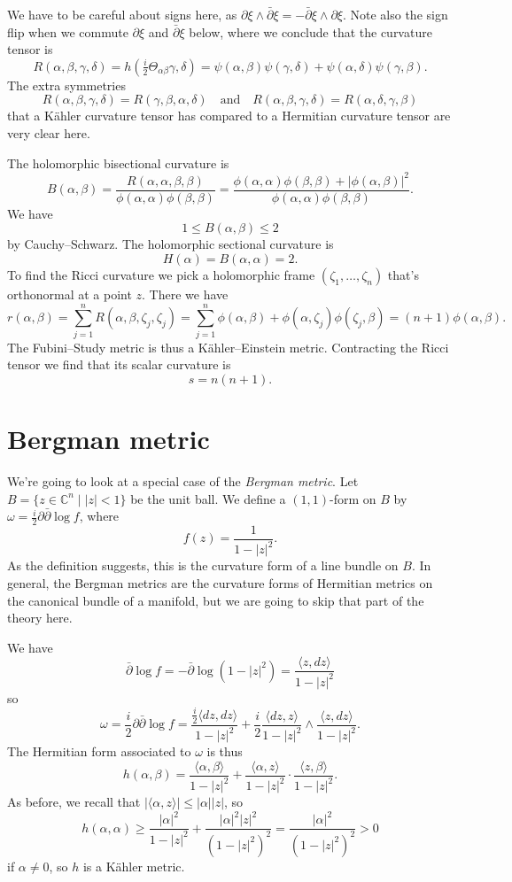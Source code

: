 \documentclass[10pt,a4paper]{article}
\newcommand{\kk}[1]{\mathbb{#1}}
\begin{document}
We have to be careful about signs here, as $\partial \xi \wedge \bar\partial \xi = - \bar\partial \xi \wedge \partial \xi$. Note also the sign flip when we commute $\partial\xi$ and $\bar\partial\xi$ below, where we conclude that the curvature tensor is
$$
R(\alpha,\beta,\gamma,\delta)
= h(\tfrac i2\Theta_{\alpha \beta} \gamma, \delta)
= \psi(\alpha, \beta) \psi(\gamma, \delta)
+ \psi(\alpha, \delta) \psi(\gamma, \beta).
$$
The extra symmetries
$$
R(\alpha,\beta,\gamma,\delta) = R(\gamma,\beta,\alpha,\delta)
\quad\text{and}\quad
R(\alpha,\beta,\gamma,\delta) = R(\alpha,\delta,\gamma,\beta)
$$
that a K\"ahler curvature tensor has compared to a Hermitian curvature tensor are very clear here.


The holomorphic bisectional curvature is
$$
B(\alpha,\beta) = \frac{R(\alpha,\alpha,\beta,\beta)}{\phi(\alpha,\alpha)\phi(\beta,\beta)}
= \frac{\phi(\alpha,\alpha)\phi(\beta,\beta)+|\phi(\alpha,\beta)|^2}{\phi(\alpha,\alpha)\phi(\beta,\beta)}.
$$
We have
$$
1 \leq B(\alpha,\beta) \leq 2
$$
by Cauchy--Schwarz. The holomorphic sectional curvature is
$$
H(\alpha) = B(\alpha,\alpha) = 2.
$$
To find the Ricci curvature we pick a holomorphic frame $(\zeta_1, \ldots, \zeta_n)$ that's orthonormal at a point $z$. There we have
$$
r(\alpha,\beta)
= \sum_{j=1}^n R(\alpha,\beta,\zeta_j,\zeta_j)
= \sum_{j=1}^n \phi(\alpha,\beta) + \phi(\alpha,\zeta_j)\phi(\zeta_j,\beta)
= (n+1) \phi(\alpha,\beta).
$$
The Fubini--Study metric is thus a K\"ahler--Einstein metric. Contracting the Ricci tensor we find that its scalar curvature is
$$
s = n(n+1).
$$




\section{Bergman metric}
\label{sec:org21fa1aa}

We're going to look at a special case of the \emph{Bergman metric}. Let $B = \{ z \in \kk C^n \mid |z|<1 \}$ be the unit ball. We define a $(1,1)$-form on $B$ by $\omega = \frac i2 \partial \bar \partial \log f$, where
$$
f(z) = \frac{1}{1-|z|^2}.
$$
As the definition suggests, this is the curvature form of a line bundle on $B$. In general, the Bergman metrics are the curvature forms of Hermitian metrics on the canonical bundle of a manifold, but we are going to skip that part of the theory here.

We have
$$
\bar\partial \log f
= - \bar\partial \log (1 -|z|^2)
= \frac{\langle z, dz\rangle}{1 - |z|^2}
$$
so
$$
\omega
= \frac i2 \partial\bar\partial \log f
= \frac{\frac i2 \langle dz, dz\rangle}{1-|z|^2}
+ \frac i2 \frac{\langle dz, z \rangle}{1-|z|^2}\wedge \frac{\langle z, dz \rangle}{1-|z|^2}.
$$
The Hermitian form associated to $\omega$ is thus
$$
h(\alpha,\beta)
=\frac{\langle \alpha, \beta\rangle}{1-|z|^2}
+ \frac{\langle \alpha, z \rangle}{1-|z|^2}
\cdot \frac{\langle z, \beta \rangle}{1-|z|^2}.
$$
As before, we recall that $|\langle \alpha, z \rangle| \leq |\alpha| |z|$, so
$$
h(\alpha,\alpha)
\geq \frac{|\alpha|^2}{1-|z|^2}
+ \frac{|\alpha|^2|z|^2}{(1-|z|^2)^2}
= \frac{|\alpha|^2}{(1-|z|^2)^2}
> 0
$$
if $\alpha \not= 0$, so $h$ is a K\"ahler metric.
\end{document}
